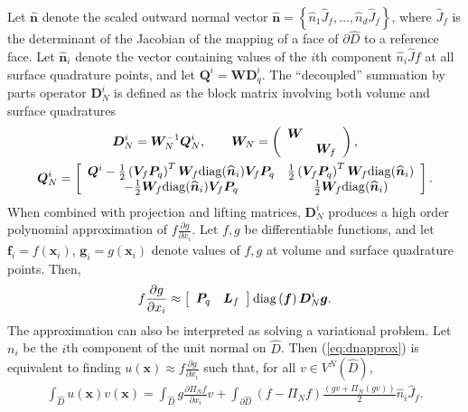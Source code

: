 \documentclass[review]{siamart0216}
\theoremstyle{assumption}
\renewcommand{\hat}[1]{\hat{#1}}
\newcommand{\pd}[2]{\frac{\partial#1}{\partial#2}}
\newcommand{\LRp}[1]{\left( #1 \right)}
\newcommand{\LRs}[1]{\left[ #1 \right]}
\newcommand{\LRc}[1]{\left\{ #1 \right\}}
\renewcommand{\hat}{\widehat}
\begin{document}
Let $\hat{\bm{n}}$ denote the scaled outward normal vector $\hat{\bm{n}} = \LRc{\hat{n}_1\hat{J}_f,\ldots,\hat{n}_d\hat{J}_f}$, where $\hat{J}_f$ is the determinant of the Jacobian of the mapping of a face of $\partial \hat{D}$ to a reference face.  Let $\hat{\bm{n}}_i$ denote the vector containing values of the $i$th component $\hat{n}_i\hat{J}f$ at all surface quadrature points, and let $\bm{Q}^i = \bm{W}\bm{D}^i_q$.  The ``decoupled'' summation by parts operator $\bm{D}^i_N$ is defined as the block matrix involving both volume and surface quadratures
\begin{gather}
\bm{D}^i_N = \bm{W}_N^{-1} \bm{Q}^i_N, \qquad \bm{W}_N = \LRp{\begin{array}{cc}\bm{W}&\\ & \bm{W}_f\end{array}},\label{eq:QN}\\
\bm{Q}^i_N  = \LRs{
\begin{array}{cc}
\bm{Q}^i - \frac{1}{2}\LRp{\bm{V}_f \bm{P}_q}^T \bm{W}_f {\rm diag}(\hat{\bm{n}}_i) \bm{V}_f\bm{P}_q &  \frac{1}{2}\LRp{\bm{V}_f \bm{P}_q}^T \bm{W}_f {\rm diag}(\hat{\bm{n}}_i)\\
-\frac{1}{2}\bm{W}_f{\rm diag}(\hat{\bm{n}}_i) \bm{V}_f\bm{P}_q & \frac{1}{2} \bm{W}_f{\rm diag}(\hat{\bm{n}}_i)
\end{array}}.  \nonumber
\end{gather}
When combined with projection and lifting matrices, $\bm{D}^i_N$ produces a high order polynomial approximation of $f\pd{g}{x_i}$. 
Let $f, g$ be differentiable functions, and let $\bm{f}_i = f(\bm{x}_i)$, $\bm{g}_i = g(\bm{x}_i)$ denote values of $f,g$ at volume and surface quadrature points.  Then,
\begin{gather}
f\pd{g}{x_i} \approx \LRs{\begin{array}{cc}
\bm{P}_q & \bm{L}_f\end{array}} {\rm diag}\LRp{\bm{f}}\bm{D}^i_N \bm{g}.  
\label{eq:dnapprox}
\end{gather}
The approximation can also be interpreted as solving a variational problem.  Let $n_i$ be the $i$th component of the unit normal on $\hat{D}$.  Then (\ref{eq:dnapprox}) is equivalent to finding $u(\bm{x}) \approx f\pd{g}{x_i}$ such that, for all $v\in V^N\LRp{\hat{D}}$, 
\begin{align*}
\int_{\hat{D}} u(\bm{x})v(\bm{x}) = \int_{\hat{D}}{g\pd{\Pi_Nf}{x_i}v} + \int_{\partial \hat{D}}{(f-\Pi_Nf)\frac{\LRp{gv + \Pi_N(gv)}}{2}}\hat{n}_i\hat{J}_f.
\end{align*}
\end{document}
